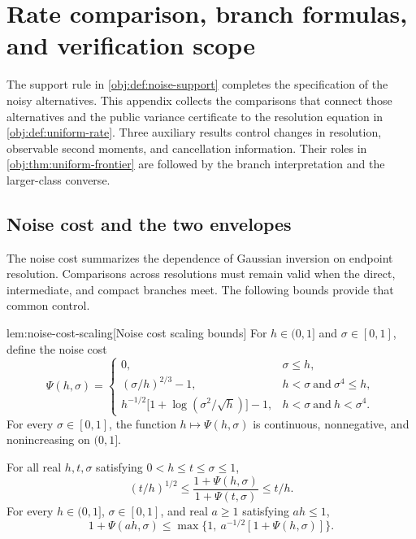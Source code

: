 \documentclass[11pt]{article}
\begin{document}
\section{Rate comparison, branch formulas, and verification scope}

The support rule in \cref{obj:def:noise-support} completes the specification of the noisy alternatives. This appendix collects the comparisons that connect those alternatives and the public variance certificate to the resolution equation in \cref{obj:def:uniform-rate}. Three auxiliary results control changes in resolution, observable second moments, and cancellation information. Their roles in \cref{obj:thm:uniform-frontier} are followed by the branch interpretation and the larger-class converse.

\subsection{Noise cost and the two envelopes}

The noise cost summarizes the dependence of Gaussian inversion on endpoint resolution. Comparisons across resolutions must remain valid when the direct, intermediate, and compact branches meet. The following bounds provide that common control.

\begin{lemmav}{lem:noise-cost-scaling}[Noise cost scaling bounds]
For \(h\in(0,1]\) and \(\sigma\in[0,1]\), define the noise cost
\[
\Psi(h,\sigma)=
\begin{cases}
0, & \sigma\le h,\\
(\sigma/h)^{2/3}-1, & h<\sigma\ \text{and}\ \sigma^4\le h,\\
h^{-1/2}\bigl[1+\log(\sigma^2/\sqrt h)\bigr]-1,
& h<\sigma\ \text{and}\ h<\sigma^4.
\end{cases}
\]
For every \(\sigma\in[0,1]\), the function \(h\mapsto\Psi(h,\sigma)\) is continuous, nonnegative, and nonincreasing on \((0,1]\).

For all real \(h,t,\sigma\) satisfying \(0<h\le t\le\sigma\le1\),
\[
(t/h)^{1/2}
\le
\frac{1+\Psi(h,\sigma)}{1+\Psi(t,\sigma)}
\le t/h.
\]
For every \(h\in(0,1]\), \(\sigma\in[0,1]\), and real \(a\ge1\) satisfying \(ah\le1\),
\[
1+\Psi(ah,\sigma)
\le
\max\bigl\{1,\ a^{-1/2}[1+\Psi(h,\sigma)]\bigr\}.
\]
\end{lemmav}
\end{document}
